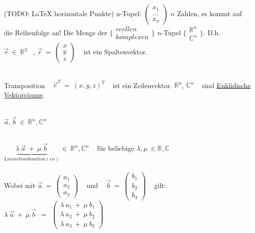 \begin{flushleft}
(TODO: LaTeX horizontale Punkte)
n-Tupel: $\left(\begin{array}{c}x_1\\ \dots\\ x_n\end{array}\right)$ \qquad $n$ Zahlen, es kommt auf die Reihenfolge an! Die Menge der $\{\begin{array}{c}reellen\\ komplexen\end{array}\}$ $n$-Tupel $\{ \begin{array}{c}\mathbb{R}^n\\ \mathbb{C}^n\end{array} \}$. D.h. ~ $\vec{r} ~ \in ~ \mathbb{R}^3$ ~, $\vec{r} ~ = ~ \left(\begin{array}{c}x\\ y\\ z\end{array}\right)$ ~ ist ein Spaltenvektor.

~\\

Transposition ~ $\vec{r}^T ~ = ~ (x, y, z)^T$ ~ ist ein Zeilenvektor. $\mathbb{R}^n$, $\mathbb{C}^n$ ~ sind \underline{Euklidische Vektorräume}.

~\\

$\vec{a}, \vec{b} ~ \in ~ \mathbb{R}^n, \mathbb{C}^n$ 

~\\

$\underbrace{\lambda ~ \vec{a} ~ + ~ \mu ~ \vec{b}}_{Linearkombination(en)} ~ \in ~ \mathbb{R}^n, \mathbb{C}^n$ ~ für beliebige $\lambda, \mu ~ \in \mathbb{R, C}$ \\

~\\

Wobei mit $\vec{a} ~ = ~ \left( \begin{array}{c}a_1\\ a_2\\ a_3\end{array} \right) $ ~ und ~ $\vec{b} ~ = ~ \left( \begin{array}{c}b_1\\ b_2\\ b_3\end{array} \right) $ ~ gilt: ~ $\lambda ~ \vec{a} ~ + ~ \mu ~ \vec{b} ~~ = ~~ \left( \begin{array}{c}\lambda ~ a_1 ~ + ~ \mu ~ b_1\\ \lambda ~ a_2 ~ + ~ \mu ~ b_2\\ \lambda ~ a_3 ~ + ~ \mu ~ b_3\end{array} \right) $


\end{flushleft}
